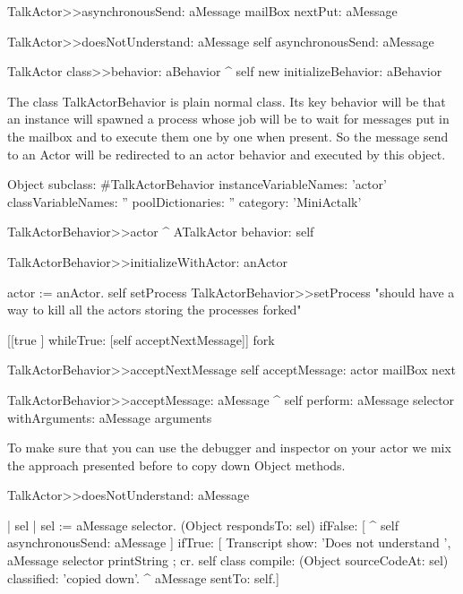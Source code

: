 \documentclass[a4paper,10pt,twoside]{book}
\begin{document}
\begin{method}{}
TalkActor>>asynchronousSend: aMessage
	mailBox nextPut: aMessage

TalkActor>>doesNotUnderstand: aMessage
 	self asynchronousSend: aMessage 
\end{method}

\begin{method}{}
TalkActor class>>behavior: aBehavior
	^ self new initializeBehavior: aBehavior
\end{method}
The class TalkActorBehavior is plain normal class. Its key behavior will be that an instance will spawned a process
whose job will be to wait for messages put in the mailbox and to execute them one by one when present. 
So the message send to an Actor will be redirected to an actor behavior and executed by this object. 

\begin{classdef}{}
Object subclass: #TalkActorBehavior
	instanceVariableNames: 'actor'
	classVariableNames: ''
	poolDictionaries: ''
	category: 'MiniActalk'
\end{classdef}

\begin{method}{}
TalkActorBehavior>>actor
	^ ATalkActor behavior: self
\end{method}

\begin{method}{}
TalkActorBehavior>>initializeWithActor: anActor

	actor := anActor.
	self setProcess
TalkActorBehavior>>setProcess
	"should have a way to kill all the actors storing the processes forked"
	
	[[true ] 
		whileTrue: [self acceptNextMessage]] fork
\end{method}


\begin{method}{}
TalkActorBehavior>>acceptNextMessage
	self acceptMessage: actor mailBox next

TalkActorBehavior>>acceptMessage: aMessage
	^ self perform: aMessage selector withArguments: aMessage arguments
\end{method}


To make sure that you can use the debugger and inspector on your actor we mix the approach 
presented before to copy down Object methods. 

\begin{method}{}
TalkActor>>doesNotUnderstand: aMessage

	| sel |
	sel := aMessage selector. 
	(Object respondsTo: sel)
		ifFalse: [ ^ self asynchronousSend: aMessage ] 
		ifTrue: [	
				Transcript show: 'Does not understand ',  aMessage selector printString ; cr.
				self class compile: (Object sourceCodeAt: sel) classified: 'copied down'.
				^ aMessage sentTo: self.]
\end{method}
\end{document}
